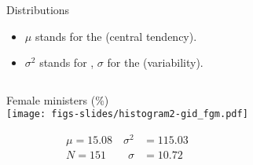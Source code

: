 \documentclass{beamer}
\begin{document}
	\begin{frame}[t]{Distributions}
	
	\begin{itemize}
		\item \textbf{$\mu$} stands for the  (central tendency).
		\item \textbf{$\sigma^2$} stands for , $\sigma$ for the  (variability).
	\end{itemize}
	
%			
%			
%			
%			
%			

	\vspace{-1.5em}
	\begin{columns}[t]
			\begin{center}
			Female ministers (\%)\\[.5em]
			\texttt{[image: figs-slides/histogram2-gid\_fgm.pdf]}
			
			\vspace{-2.5em}
			\begin{align*}
				\mu = 15.08\hspace{1em}\sigma^2 &= 115.03\\
				N = 151\hspace{2em}\sigma &= 10.72			
			\end{align*}


\end{center}
\end{columns}
\end{frame}
\end{document}
